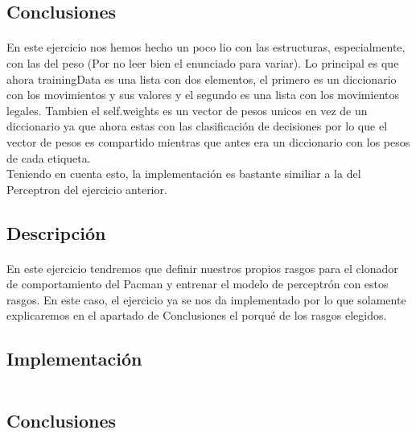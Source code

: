 \documentclass{report}
\begin{document}
      \subsection*{Conclusiones}
        \paragraph*{}{
          En este ejercicio nos hemos hecho un poco lio con las estructuras, especialmente, con las del peso (Por no leer bien el enunciado para variar).
          Lo principal es que ahora trainingData es una lista con dos elementos, el primero es un diccionario con los movimientos y sus valores y el segundo es una lista con los movimientos legales.
          Tambien el self.weights es un vector de pesos unicos en vez de un diccionario ya que ahora estas con las clasificación de decisiones por lo que el vector de pesos es compartido mientras que antes era un diccionario con los pesos de cada etiqueta.\\

          Teniendo en cuenta esto, la implementación es bastante similiar a la del Perceptron del ejercicio anterior.
        }
      \subsection*{Descripción}
        \paragraph*{}{
          En este ejercicio tendremos que definir nuestros propios rasgos para el clonador de comportamiento del Pacman y entrenar el modelo de perceptrón con estos rasgos.
          En este caso, el ejercicio ya se nos da implementado por lo que solamente explicaremos en el apartado de Conclusiones el porqué de los rasgos elegidos.
        }
      \subsection*{Implementación}
        \begin{lstlisting}[language=Python, caption=Implementación del clonador de comportamiento del pacman con rasgos diseñados por nosotros]
        \end{lstlisting}
      \subsection*{Conclusiones}
\end{document}
